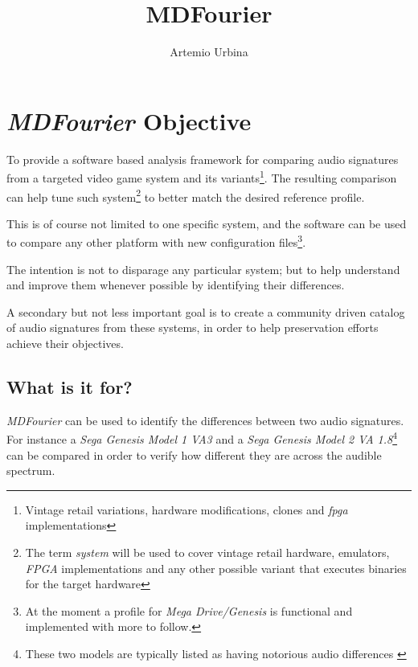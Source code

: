\documentclass[10pt,a4paper]{report}
\title{MDFourier}
\author{Artemio Urbina}
\begin{document}
\begin{titlepage}
	\maketitle
	\thispagestyle{empty}
\end{titlepage}

\tableofcontents

\chapter{\textit{MDFourier} Objective}

To provide a software based analysis framework for comparing audio signatures from a targeted video game system and its variants\footnote{Vintage retail variations, hardware modifications, clones and \textit{\acrfull{fpga}} implementations}. The resulting comparison can help tune such system\footnote{The term \textit{system} will be used to cover vintage retail hardware, emulators, \textit{FPGA} implementations and any other possible variant that executes binaries for the target hardware} to better match the desired reference profile.

This is of course not limited to one specific system, and the software can be used to compare any other platform with new configuration files\footnote{At the moment a profile for \textit{Mega Drive/Genesis} is functional and implemented with more to follow.}.

The intention is not to disparage any particular system; but to help understand and improve them whenever possible by identifying their differences.

A secondary but not less important goal is to create a community driven catalog of audio signatures from these systems, in order to help preservation efforts achieve their objectives.

\section{What is it for?}

\textit{MDFourier} can be used to identify the differences between two audio signatures. For instance a \textit{Sega Genesis Model 1 VA3} and a \textit{Sega Genesis Model 2 VA 1.8}\footnote{These two models are typically listed as having notorious audio differences \cite{genesisaudio}} can be compared in order to verify how different they are across the audible spectrum. 
\end{document}
